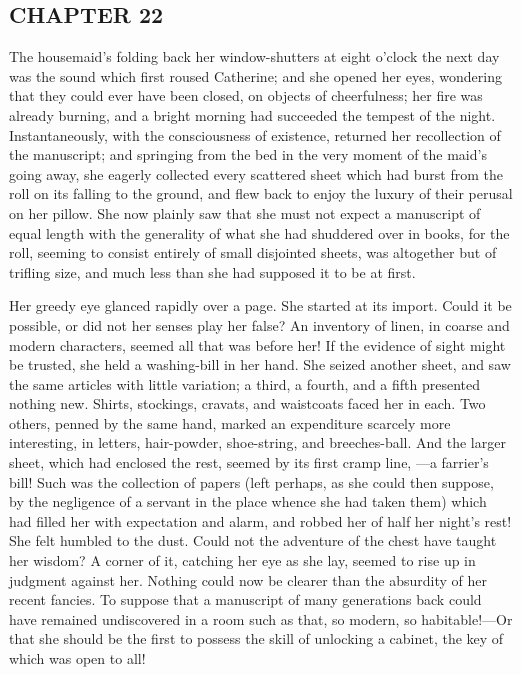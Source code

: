 \subsection[chapter-22]{\useURL[url24][][][]\from[url24]CHAPTER 22}

The housemaid's folding back her window-shutters at eight o'clock the next day was the sound which first roused Catherine; and she opened her eyes, wondering that they could ever have been closed, on objects of cheerfulness; her fire was already burning, and a bright morning had succeeded the tempest of the night. Instantaneously, with the consciousness of existence, returned her recollection of the manuscript; and springing from the bed in the very moment of the maid's going away, she eagerly collected every scattered sheet which had burst from the roll on its falling to the ground, and flew back to enjoy the luxury of their perusal on her pillow. She now plainly saw that she must not expect a manuscript of equal length with the generality of what she had shuddered over in books, for the roll, seeming to consist entirely of small disjointed sheets, was altogether but of trifling size, and much less than she had supposed it to be at first.

Her greedy eye glanced rapidly over a page. She started at its import. Could it be possible, or did not her senses play her false? An inventory of linen, in coarse and modern characters, seemed all that was before her! If the evidence of sight might be trusted, she held a washing-bill in her hand. She seized another sheet, and saw the same articles with little variation; a third, a fourth, and a fifth presented nothing new. Shirts, stockings, cravats, and waistcoats faced her in each. Two others, penned by the same hand, marked an expenditure scarcely more interesting, in letters, hair-powder, shoe-string, and breeches-ball. And the larger sheet, which had enclosed the rest, seemed by its first cramp line, ---a farrier's bill! Such was the collection of papers (left perhaps, as she could then suppose, by the negligence of a servant in the place whence she had taken them) which had filled her with expectation and alarm, and robbed her of half her night's rest! She felt humbled to the dust. Could not the adventure of the chest have taught her wisdom? A corner of it, catching her eye as she lay, seemed to rise up in judgment against her. Nothing could now be clearer than the absurdity of her recent fancies. To suppose that a manuscript of many generations back could have remained undiscovered in a room such as that, so modern, so habitable!---Or that she should be the first to possess the skill of unlocking a cabinet, the key of which was open to all!

